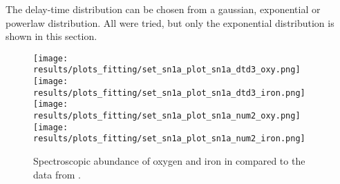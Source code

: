 The delay-time distribution can be chosen from a gaussian, exponential or powerlaw distribution.
All were tried, but only the exponential distribution is shown in this section.

\begin{figure}[h]
  \centering
  \texttt{[image: results/plots\_fitting/set\_sn1a\_plot\_sn1a\_dtd3\_oxy.png]}
  \texttt{[image: results/plots\_fitting/set\_sn1a\_plot\_sn1a\_dtd3\_iron.png]}
  \texttt{[image: results/plots\_fitting/set\_sn1a\_plot\_sn1a\_num2\_oxy.png]}
  \texttt{[image: results/plots\_fitting/set\_sn1a\_plot\_sn1a\_num2\_iron.png]}
  \caption[Fit of type 1a supernovae \fiduccialomega]{\label{fig:fit-sn1a}
    Spectroscopic abundance of oxygen and iron in \omegamodel compared to the data from \eris.
  }
\end{figure}
\FloatBarrier

